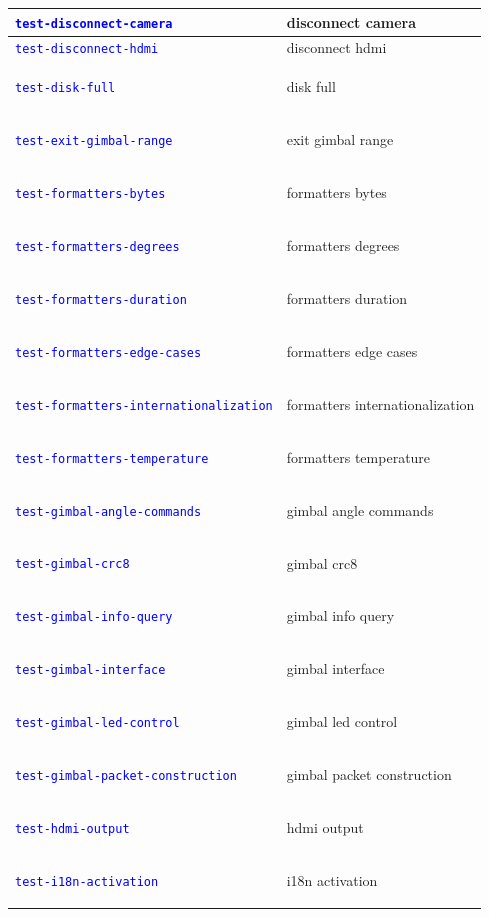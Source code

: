 \documentclass[12pt, titlepage]{article}
\newcommand{\tiddef}[1]{\hypertarget{tid:#1}{\textcolor{blue}{\texttt{#1}}}}
\begin{document}
\begin{longtable}{|>{\raggedright\arraybackslash}p{5cm}|>{\raggedright\arraybackslash}p{9cm}|}
  \tiddef{test-disconnect-camera}                      & disconnect camera                      \\ \hline
  \tiddef{test-disconnect-hdmi}                        & disconnect hdmi                        \\ \hline
  \tiddef{test-disk-full}                              & disk full                              \\ \hline
  \tiddef{test-exit-gimbal-range}                      & exit gimbal range                      \\ \hline
  \tiddef{test-formatters-bytes}                       & formatters bytes                       \\ \hline
  \tiddef{test-formatters-degrees}                     & formatters degrees                     \\ \hline
  \tiddef{test-formatters-duration}                    & formatters duration                    \\ \hline
  \tiddef{test-formatters-edge-cases}                  & formatters edge cases                  \\ \hline
  \tiddef{test-formatters-internationalization}        & formatters internationalization        \\ \hline
  \tiddef{test-formatters-temperature}                 & formatters temperature                 \\ \hline
  \tiddef{test-gimbal-angle-commands}                  & gimbal angle commands                  \\ \hline
  \tiddef{test-gimbal-crc8}                            & gimbal crc8                            \\ \hline
  \tiddef{test-gimbal-info-query}                      & gimbal info query                      \\ \hline
  \tiddef{test-gimbal-interface}                       & gimbal interface                       \\ \hline
  \tiddef{test-gimbal-led-control}                     & gimbal led control                     \\ \hline
  \tiddef{test-gimbal-packet-construction}             & gimbal packet construction             \\ \hline
  \tiddef{test-hdmi-output}                            & hdmi output                            \\ \hline
  \tiddef{test-i18n-activation}                        & i18n activation                        \\ \hline

\end{longtable}
\end{document}
